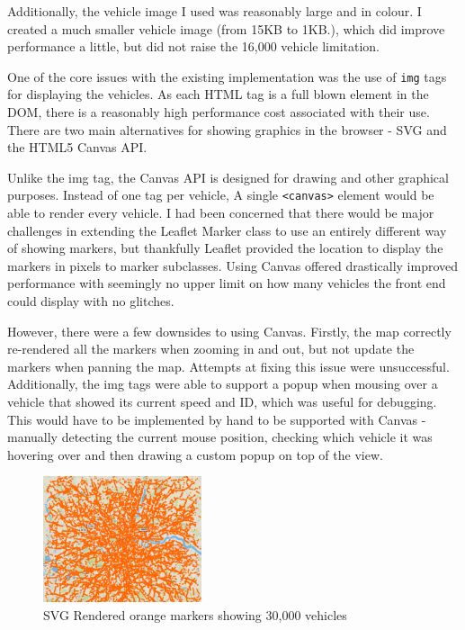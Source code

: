 \documentclass[ %
                    author={Alexander Hill},
                supervisor={Dr. Benjamin Sach},
                    degree={MEng},
                     title={MARMOSET},
                  subtitle={Multi-Agent Route Management using Online Simulation for Efficient Transportation},
                      type={research},
                      year={2016} ]{dissertation}
\begin{document}
Additionally, the vehicle image I used was reasonably large and in colour. I
created a much smaller vehicle image (from 15KB to 1KB.), which
did improve performance a little, but did not raise the 16,000 vehicle
limitation.

One of the core issues with the existing implementation was the use of
\texttt{img} tags for displaying the vehicles. As each HTML tag is a full blown
element in the DOM, there is a reasonably high performance cost associated with
their use. There are two main alternatives for showing graphics in the browser -
SVG and the HTML5 Canvas API.

Unlike the img tag, the Canvas API is designed for drawing and other graphical
purposes. Instead of one tag per vehicle, A single \texttt{<canvas>} element
would be able to render every vehicle. I had been concerned that there would be
major challenges in extending the Leaflet Marker class to use an entirely
different way of showing markers, but thankfully Leaflet provided the location
to display the markers in pixels to marker subclasses. Using Canvas offered
drastically improved performance with seemingly no upper limit on how many
vehicles the front end could display with no glitches.

However, there were a few downsides to using Canvas. Firstly, the map correctly
re-rendered all the markers when zooming in and out, but not update the markers
when panning the map. Attempts at fixing this issue were unsuccessful.
Additionally, the img tags were able to support a popup when mousing over a
vehicle that showed its current speed and ID, which was useful for debugging.
This would have to be implemented by hand to be supported with Canvas - manually
detecting the current mouse position, checking which vehicle it was hovering
over and then drawing a custom popup on top of the view.

\begin{figure}
    \centering
    \includegraphics[height=10em]{orange-markers}
    \caption{SVG Rendered orange markers showing 30,000 vehicles}\label{fig:orange-markers}
\end{figure}
\end{document}
